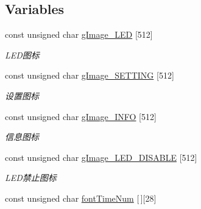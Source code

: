 \subsection*{\-Variables}
\begin{DoxyCompactItemize}
\item 
\hypertarget{group___w_i_d_g_e_t_gade592d4d7d3059dc93d2bb83b39b3db6}{const unsigned char \hyperlink{group___w_i_d_g_e_t_gade592d4d7d3059dc93d2bb83b39b3db6}{g\-Image\-\_\-\-L\-E\-D} \mbox{[}512\mbox{]}}\label{group___w_i_d_g_e_t_gade592d4d7d3059dc93d2bb83b39b3db6}

\begin{DoxyCompactList}\small\item\em \-L\-E\-D图标 \end{DoxyCompactList}\item 
\hypertarget{group___w_i_d_g_e_t_gaa649afc64d2f2a99b429fa4e5fb13d50}{const unsigned char \hyperlink{group___w_i_d_g_e_t_gaa649afc64d2f2a99b429fa4e5fb13d50}{g\-Image\-\_\-\-S\-E\-T\-T\-I\-N\-G} \mbox{[}512\mbox{]}}\label{group___w_i_d_g_e_t_gaa649afc64d2f2a99b429fa4e5fb13d50}

\begin{DoxyCompactList}\small\item\em 设置图标 \end{DoxyCompactList}\item 
\hypertarget{group___w_i_d_g_e_t_ga26e73b61ee22edf6ce4b9592a6d1ffd2}{const unsigned char \hyperlink{group___w_i_d_g_e_t_ga26e73b61ee22edf6ce4b9592a6d1ffd2}{g\-Image\-\_\-\-I\-N\-F\-O} \mbox{[}512\mbox{]}}\label{group___w_i_d_g_e_t_ga26e73b61ee22edf6ce4b9592a6d1ffd2}

\begin{DoxyCompactList}\small\item\em 信息图标 \end{DoxyCompactList}\item 
\hypertarget{group___w_i_d_g_e_t_ga42de702f802d2ab0de797d4712a516df}{const unsigned char \hyperlink{group___w_i_d_g_e_t_ga42de702f802d2ab0de797d4712a516df}{g\-Image\-\_\-\-L\-E\-D\-\_\-\-D\-I\-S\-A\-B\-L\-E} \mbox{[}512\mbox{]}}\label{group___w_i_d_g_e_t_ga42de702f802d2ab0de797d4712a516df}

\begin{DoxyCompactList}\small\item\em \-L\-E\-D禁止图标 \end{DoxyCompactList}\item 
\hypertarget{group___w_i_d_g_e_t_ga4e313eb11c9272ec38246bbc0f4cec42}{const unsigned char \hyperlink{group___w_i_d_g_e_t_ga4e313eb11c9272ec38246bbc0f4cec42}{font\-Time\-Num} \mbox{[}$\,$\mbox{]}\mbox{[}28\mbox{]}}\label{group___w_i_d_g_e_t_ga4e313eb11c9272ec38246bbc0f4cec42}


\end{DoxyCompactItemize}
